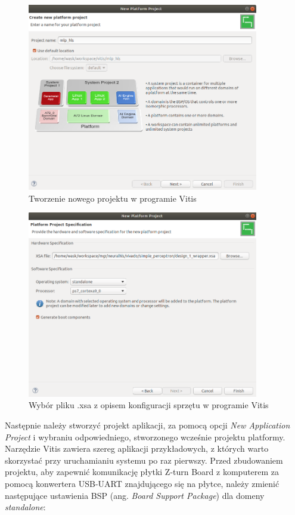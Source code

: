 \begin{figure}[!h]
  \centering
  \includegraphics[width=0.9\textwidth]{img/new-vitis-project1.png}
  \caption{Tworzenie nowego projektu w programie Vitis}
  \label{new-vitis-project1}
\end{figure}


\begin{figure}[!h]
  \centering
  \includegraphics[width=0.9\textwidth]{img/new-vitis-project2.png}
  \caption{Wybór pliku .xsa z opisem konfiguracji sprzętu w programie Vitis}
  \label{new-vitis-project2}
\end{figure}

Następnie należy stworzyć projekt aplikacji, za pomocą opcji \emph{New Application Project} i wybraniu odpowiedniego, 
stworzonego wcześnie projektu platformy. Narzędzie Vitis zawiera szereg aplikacji przykładowych, z których warto 
skorzystać przy uruchamianiu systemu po raz pierwszy. Przed zbudowaniem projektu, aby zapewnić komunikację płytki 
Z-turn Board z komputerem za pomocą konwertera USB-UART znajdującego się na płytce, należy zmienić następujące 
ustawienia BSP (ang. \emph{Board Support Package}) dla domeny \emph{standalone}:


